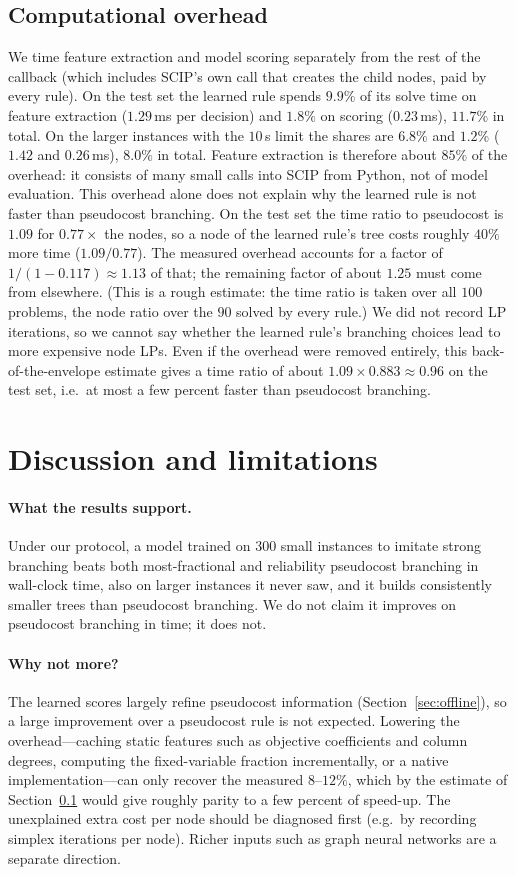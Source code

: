 \documentclass[11pt,a4paper]{article}
\begin{document}
\subsection{Computational overhead}\label{sec:overhead}
We time feature extraction and model scoring separately from the rest of the callback (which includes SCIP's own call that creates the child nodes, paid by every rule). On the test set the learned rule spends $9.9\%$ of its solve time on feature extraction ($1.29$\,ms per decision) and $1.8\%$ on scoring ($0.23$\,ms), $11.7\%$ in total. On the larger instances with the $10$\,s limit the shares are $6.8\%$ and $1.2\%$ ($1.42$ and $0.26$\,ms), $8.0\%$ in total. Feature extraction is therefore about $85\%$ of the overhead: it consists of many small calls into SCIP from Python, not of model evaluation. This overhead alone does not explain why the learned rule is not faster than pseudocost branching. On the test set the time ratio to pseudocost is $1.09$ for $0.77\times$ the nodes, so a node of the learned rule's tree costs roughly $40\%$ more time ($1.09/0.77$). The measured overhead accounts for a factor of $1/(1-0.117)\approx 1.13$ of that; the remaining factor of about $1.25$ must come from elsewhere. (This is a rough estimate: the time ratio is taken over all $100$ problems, the node ratio over the $90$ solved by every rule.) We did not record LP iterations, so we cannot say whether the learned rule's branching choices lead to more expensive node LPs. Even if the overhead were removed entirely, this back-of-the-envelope estimate gives a time ratio of about $1.09\times0.883\approx 0.96$ on the test set, i.e.\ at most a few percent faster than pseudocost branching.
 
\section{Discussion and limitations}
\paragraph{What the results support.} Under our protocol, a model trained on $300$ small instances to imitate strong branching beats both most-fractional and reliability pseudocost branching in wall-clock time, also on larger instances it never saw, and it builds consistently smaller trees than pseudocost branching. We do not claim it improves on pseudocost branching in time; it does not.
\paragraph{Why not more?} The learned scores largely refine pseudocost information (Section~\ref{sec:offline}), so a large improvement over a pseudocost rule is not expected. Lowering the overhead---caching static features such as objective coefficients and column degrees, computing the fixed-variable fraction incrementally, or a native implementation---can only recover the measured $8$--$12\%$, which by the estimate of Section~\ref{sec:overhead} would give roughly parity to a few percent of speed-up. The unexplained extra cost per node should be diagnosed first (e.g.\ by recording simplex iterations per node). Richer inputs such as graph neural networks \citep{gasse2019exact} are a separate direction.
\end{document}
